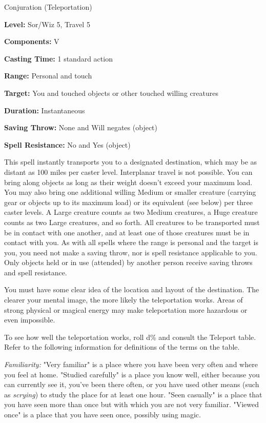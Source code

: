 
Conjuration (Teleportation)

\textbf{Level:} Sor/Wiz 5, Travel 5

\textbf{Components:} V

\textbf{Casting Time:} 1 standard action

\textbf{Range:} Personal and touch

\textbf{Target:} You and touched objects or other touched willing creatures

\textbf{Duration:} Instantaneous

\textbf{Saving Throw:} None and Will negates (object)

\textbf{Spell Resistance:} No and Yes (object)

This spell instantly transports you to a designated destination, which may be as 
distant as 100 miles per caster level. Interplanar travel is not possible. You 
can bring along objects as long as their weight doesn't exceed your maximum load. 
You may also bring one additional willing Medium or smaller creature (carrying 
gear or objects up to its maximum load) or its equivalent (see below) per three 
caster levels. A Large creature counts as two Medium creatures, a Huge creature 
counts as two Large creatures, and so forth. All creatures to be transported must 
be in contact with one another, and at least one of those creatures must be in 
contact with you. As with all spells where the range is personal and the target 
is you, you need not make a saving throw, nor is spell resistance applicable to 
you. Only objects held or in use (attended) by another person receive saving throws 
and spell resistance.

You must have some clear idea of the location and layout of the destination. The 
clearer your mental image, the more likely the teleportation works. Areas of strong 
physical or magical energy may make teleportation more hazardous or even impossible.

To see how well the teleportation works, roll d\% and consult the Teleport table. 
Refer to the following information for definitions of the terms on the table.

\textit{Familiarity:} "Very familiar" is a place where you have been very often 
and where you feel at home. "Studied carefully" is a place you know well, either 
because you can currently see it, you've been there often, or you have used other 
means (such as \textit{scrying}) to study the place for at least one hour. "Seen 
casually" is a place that you have seen more than once but with which you are 
not very familiar. "Viewed once" is a place that you have seen once, possibly 
using magic. 

